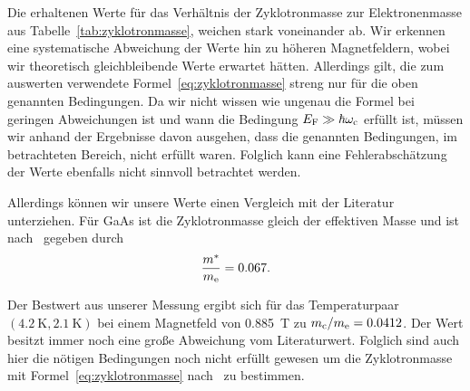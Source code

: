 \documentclass[paper=a4,fontsize=10pt,DIV=18,twocolumn,parskip=half]{scrartcl}
\numberwithin{equation}{section}    %
\newcommand{\kor}[1]{{\color{darkgreen}#1}}
\begin{document}
\kor{
Die erhaltenen Werte für das Verhältnis der Zyklotronmasse zur Elektronenmasse aus Tabelle~\ref{tab:zyklotronmasse}, weichen stark voneinander ab. Wir erkennen eine systematische Abweichung der Werte hin zu höheren Magnetfeldern, wobei wir theoretisch gleichbleibende Werte erwartet hätten. Allerdings gilt, die zum auswerten verwendete Formel~\eqref{eq:zyklotronmasse} streng nur für die oben genannten Bedingungen. Da wir nicht wissen wie ungenau die Formel bei geringen Abweichungen ist und wann die Bedingung $E_{\rm F} \gg \hbar\omega_{\rm c}$ erfüllt ist, müssen wir anhand der Ergebnisse davon ausgehen, dass die genannten Bedingungen, im betrachteten Bereich, nicht erfüllt waren. Folglich kann eine Fehlerabschätzung der Werte ebenfalls nicht sinnvoll betrachtet werden.

Allerdings können wir unsere Werte einen Vergleich mit der Literatur unterziehen. Für GaAs ist die Zyklotronmasse gleich der effektiven Masse und ist nach~\citet{saarland} gegeben durch
\begin{equation}
	\frac{m^*}{m_{\rm e}} = 0.067.
\end{equation}

Der Bestwert aus unserer Messung ergibt sich für das Temperaturpaar $(\SI{4.2}{\kelvin},\SI{2.1}{\kelvin})$ bei einem Magnetfeld von \SI{0.885}{\tesla} zu $m_{\rm c}/m_{\rm e} = 0.0412$. Der Wert besitzt immer noch eine große Abweichung vom Literaturwert. Folglich sind auch hier die nötigen Bedingungen noch nicht erfüllt gewesen um die Zyklotronmasse mit Formel~\eqref{eq:zyklotronmasse} nach~\citet{ando} zu bestimmen.

}

\end{document}
